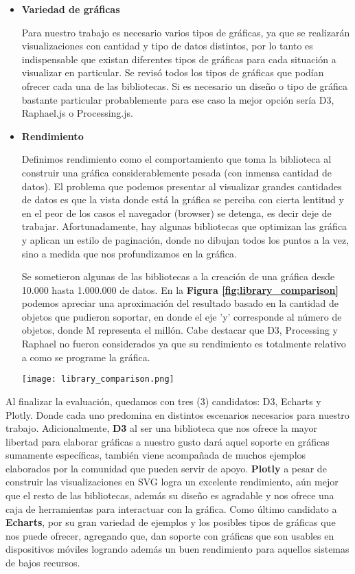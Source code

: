 \begin{itemize}
\item \textbf{Variedad de gráficas}

Para nuestro trabajo es necesario varios tipos de gráficas, ya que se realizarán visualizaciones con cantidad y tipo de datos distintos, por lo tanto es indispensable que existan diferentes tipos de gráficas para cada situación a visualizar en particular. Se revisó todos los tipos de gráficas que podían ofrecer cada una de las bibliotecas. Si es necesario un diseño o tipo de gráfica bastante particular probablemente para ese caso la mejor opción sería D3, Raphael.js o Processing.js.

\item \textbf{Rendimiento}

Definimos rendimiento como el comportamiento que toma la biblioteca al construir una gráfica considerablemente pesada (con inmensa cantidad de datos). El problema que podemos presentar al visualizar grandes cantidades de datos es que la vista donde está la gráfica se perciba con cierta lentitud y en el peor de los casos el navegador (browser) se detenga, es decir deje de trabajar. Afortunadamente, hay algunas bibliotecas que optimizan las gráfica y aplican un estilo de paginación, donde no dibujan todos los puntos a la vez, sino a medida que nos profundizamos en la gráfica.

Se sometieron algunas de las bibliotecas a la creación de una gráfica desde 10.000 hasta 1.000.000 de datos. En la \textbf{Figura \ref{fig:library_comparison}} podemos apreciar una aproximación del resultado basado en la cantidad de objetos que pudieron soportar, en donde el eje 'y' corresponde al número de objetos, donde M representa el millón. Cabe destacar que D3, Processing y Raphael no fueron considerados ya que su rendimiento es totalmente relativo a como se programe la gráfica.
\bigbreak
\begin{center}
\texttt{[image: library\_comparison.png]}
\label{fig:library_comparison}
\end{center}
\bigbreak
\end{itemize}
Al finalizar la evaluación, quedamos con tres (3) candidatos: D3, Echarts y Plotly. Donde cada uno predomina en distintos escenarios necesarios para nuestro trabajo. Adicionalmente, \textbf{D3} al ser una biblioteca que nos ofrece la mayor libertad para elaborar gráficas a nuestro gusto dará aquel soporte en gráficas sumamente específicas, también viene acompañada de muchos ejemplos elaborados por la comunidad que pueden servir de apoyo. \textbf{Plotly} a pesar de construir las visualizaciones en SVG logra un excelente rendimiento, aún mejor que el resto de las bibliotecas, además su diseño es agradable y nos ofrece una caja de herramientas para interactuar con la gráfica. Como último candidato a \textbf{Echarts}, por su gran variedad de ejemplos y los posibles tipos de gráficas que nos puede ofrecer, agregando que, dan soporte con gráficas que son usables en dispositivos móviles logrando además un buen rendimiento para aquellos sistemas de bajos recursos.











